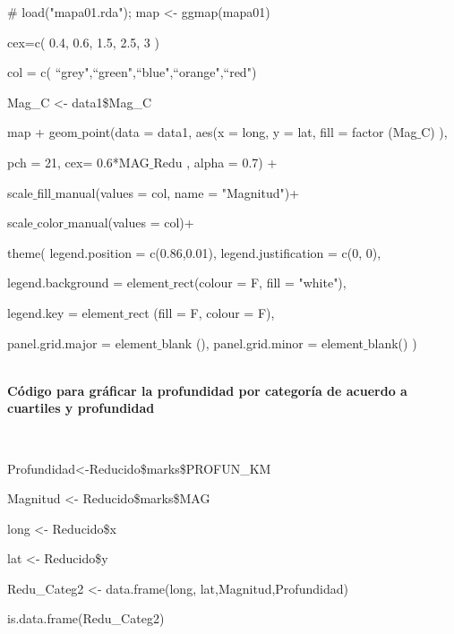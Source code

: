 \documentclass[12pt]{report}
\begin{document}
{{{{{{{{{{{{{			 		\#	load("mapa01.rda"); 	map <- ggmap(mapa01)
			 		
			 		cex=c( 0.4, 0.6, 1.5, 2.5, 3 ) 
			 		
			 		col = c( “grey",“green",“blue",“orange",“red")
			 		
			 		Mag\_C <- data1\$Mag\_C  }}
			 
			 
			 
			 
			 
			 	
			 	{ \scriptsize  { \ttfamily    
			    
			    
			    map + geom$\_$point(data = data1,  aes(x = long, y = lat, fill = factor (Mag$\_$C) ),
			    
			     pch = 21,  cex= 0.6*MAG$\_$Redu ,  alpha = 0.7) + 
			     
			    scale$\_$fill$\_$manual(values = col, name = "Magnitud")+ 
			    
			    scale$\_$color$\_$manual(values = col)+
			    
			    theme( 
			    legend.position = c(0.86,0.01), legend.justification = c(0, 0),
			    
			    legend.background = element$\_$rect(colour = F, fill = "white"),
			    
			    legend.key = element$\_$rect (fill = F, colour = F),   \vspace{-0,15 cm} 
			    
			    panel.grid.major = element$\_$blank (),  panel.grid.minor = element$\_$blank() )           
		                           }}  \\
			    
			    
			    		
			  \textbf{Código para  gráficar la profundidad por categoría de acuerdo a cuartiles y profundidad}{\label{M-codigo}\\			 				
			  
			  
			   { \scriptsize  { \ttfamily  		
			  		
			  
			  
			  
			  Profundidad<-Reducido\$marks\$PROFUN\_KM
			   
			  Magnitud <- Reducido\$marks\$MAG
			  
			  long <- Reducido\$x
			  
			  lat <- Reducido\$y
			  
			  Redu\_Categ2 <-  data.frame(long, lat,Magnitud,Profundidad)  
			         
			  is.data.frame(Redu\_Categ2)
			  
}}}}}}}}}}}}}}
\end{document}
